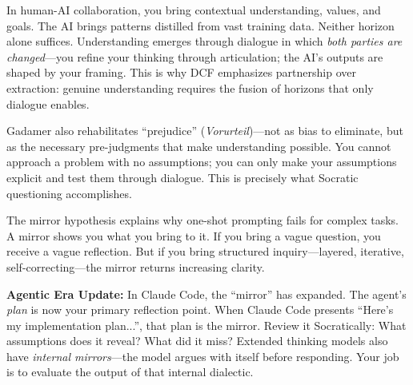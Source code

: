 In human-AI collaboration, you bring contextual understanding, values, and goals. The AI brings patterns distilled from vast training data. Neither horizon alone suffices. Understanding emerges through dialogue in which \emph{both parties are changed}---you refine your thinking through articulation; the AI's outputs are shaped by your framing. This is why DCF emphasizes partnership over extraction: genuine understanding requires the fusion of horizons that only dialogue enables.

Gadamer also rehabilitates ``prejudice'' (\emph{Vorurteil})---not as bias to eliminate, but as the necessary pre-judgments that make understanding possible. You cannot approach a problem with no assumptions; you can only make your assumptions explicit and test them through dialogue. This is precisely what Socratic questioning accomplishes.

The mirror hypothesis explains why one-shot prompting fails for complex tasks. A mirror shows you what you bring to it. If you bring a vague question, you receive a vague reflection. But if you bring structured inquiry---layered, iterative, self-correcting---the mirror returns increasing clarity.

\begin{quotebox}
\textbf{Agentic Era Update:} In Claude Code, the ``mirror'' has expanded. The agent's \emph{plan} is now your primary reflection point. When Claude Code presents ``Here's my implementation plan...'', that plan is the mirror. Review it Socratically: What assumptions does it reveal? What did it miss? Extended thinking models also have \emph{internal mirrors}---the model argues with itself before responding. Your job is to evaluate the output of that internal dialectic.
\end{quotebox}
